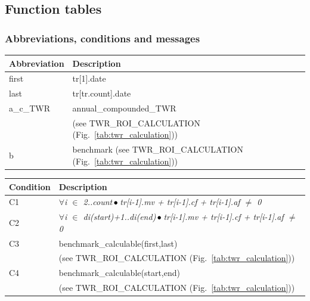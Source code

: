 \documentclass[runningheads,12pt]{article}
\begin{document}




\newpage

\subsection{Function tables}




\subsubsection{Abbreviations, conditions and messages}
{\centering
\begin{longtable}{|l|p{11cm}|}
\hline
\textbf{Abbreviation} & \textbf{Description}\\

\hline
first & tr[1].date \\

\hline
last & tr[tr.count].date\\

\hline
 a\_c\_TWR & annual\_compounded\_TWR\\
& (see TWR\_ROI\_CALCULATION (Fig.~\ref{tab:twr_calculation})) \\

\hline
 b & benchmark (see TWR\_ROI\_CALCULATION (Fig.~\ref{tab:twr_calculation}))\\



\hline
\end{longtable}

\centering
\begin{longtable}{|l|p{12cm}|}
\hline
\textbf{Condition} & \textbf{Description}\\

\hline
C1 & \textit{$\forall$i $\in$ 2..count$\,\bullet\,$tr[i-1].mv + tr[i-1].cf + tr[i-1].af $\neq$ 0}\\

\hline
C2 & \textit{$\forall$i $\in$ di(start)+1..di(end)$\,\bullet\,$tr[i-1].mv + tr[i-1].cf + tr[i-1].af $\neq$ 0}\\

\hline
C3 & benchmark\_calculable(first,last)\\
& (see TWR\_ROI\_CALCULATION (Fig.~\ref{tab:twr_calculation}))\\

\hline
C4 & benchmark\_calculable(start,end)\\
&(see TWR\_ROI\_CALCULATION (Fig.~\ref{tab:twr_calculation}))\\


\end{longtable}}
\end{document}
